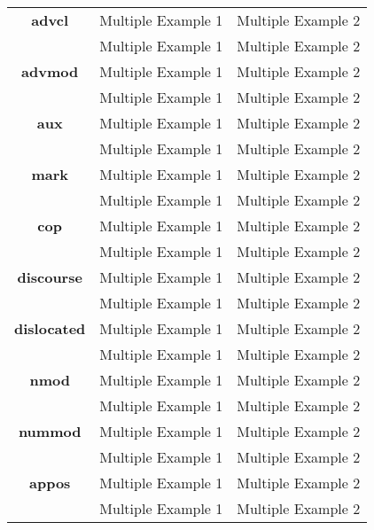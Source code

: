 \documentclass[a4 paper]{article}
\begin{document}
\begin{longtable}{cp{}p{}}
    \midrule
    \addlinespace[0.5em]
    \textbf{advcl}
                 & Multiple Example 1 & Multiple Example 2\\
    \addlinespace[0.5em]
                 & Multiple Example 1 & Multiple Example 2\\
    \midrule
    \textbf{advmod}
                 & Multiple Example 1 & Multiple Example 2\\
    \addlinespace[0.5em]
                 & Multiple Example 1 & Multiple Example 2\\
    \midrule
    \textbf{aux}
                 & Multiple Example 1 & Multiple Example 2\\
    \addlinespace[0.5em]
                 & Multiple Example 1 & Multiple Example 2\\
    \midrule
    \textbf{mark}
                 & Multiple Example 1 & Multiple Example 2\\
    \addlinespace[0.5em]
                 & Multiple Example 1 & Multiple Example 2\\
    \midrule
    \textbf{cop}
                 & Multiple Example 1 & Multiple Example 2\\
    \addlinespace[0.5em]
                 & Multiple Example 1 & Multiple Example 2\\
    \midrule
    \textbf{discourse}
                 & Multiple Example 1 & Multiple Example 2\\
    \addlinespace[0.5em]
                 & Multiple Example 1 & Multiple Example 2\\
    \midrule
    \textbf{dislocated}
                 & Multiple Example 1 & Multiple Example 2\\
    \addlinespace[0.5em]
                 & Multiple Example 1 & Multiple Example 2\\
    \midrule
    \textbf{nmod}
                 & Multiple Example 1 & Multiple Example 2\\
    \addlinespace[0.5em]
                 & Multiple Example 1 & Multiple Example 2\\
    \midrule
    \textbf{nummod}
                 & Multiple Example 1 & Multiple Example 2\\
    \addlinespace[0.5em]
                 & Multiple Example 1 & Multiple Example 2\\
    \midrule
    \textbf{appos}
                 & Multiple Example 1 & Multiple Example 2\\
    \addlinespace[0.5em]
                 & Multiple Example 1 & Multiple Example 2\\

\end{longtable}
\end{document}
